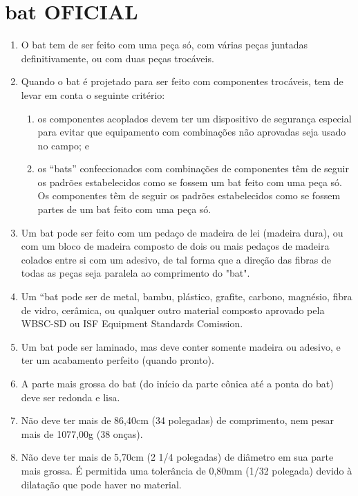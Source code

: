 \section{\gls{bat} OFICIAL }\label{sec:bat}
\begin{multicols}{2}
	\begin{enumerate}[label= \arabic*)]
		\item  O \gls{bat} tem de ser feito com uma pe\c{c}a s\'o, com v\'arias pe\c{c}as juntadas
		definitivamente, ou com duas pe\c{c}as troc\'aveis.
		\item Quando o \gls{bat} \'e projetado para ser feito com componentes troc\'aveis, tem de levar em conta o seguinte crit\'erio:
		\begin{enumerate}[label=\roman*.]
			\item os componentes acoplados devem ter um dispositivo de seguran\c{c}a especial para evitar que equipamento com combina\c{c}ões n\~ao aprovadas seja usado no campo; e
			\item os “bats” confeccionados com combina\c{c}ões de componentes t\^em de seguir os padrões estabelecidos como se fossem um \gls{bat} feito com uma pe\c{c}a s\'o. Os componentes t\^em de seguir os padrões estabelecidos como se fossem partes de um \gls{bat} feito com uma pe\c{c}a s\'o.
		\end{enumerate}
		\item  Um \gls{bat} pode ser feito com um peda\c{c}o de madeira de lei (madeira dura), ou com um bloco de madeira composto de dois ou mais peda\c{c}os de madeira colados entre si com um adesivo, de tal forma que a dire\c{c}\~ao das fibras de todas as pe\c{c}as seja paralela ao comprimento do "bat".
		\item  Um “bat pode ser de metal, bambu, pl\'astico, grafite, carbono, magn\'esio, fibra de vidro, cer\^amica, ou qualquer outro material composto aprovado pela WBSC-SD ou ISF Equipment Standards Comission.
		\item  Um \gls{bat} pode ser laminado, mas deve conter somente madeira ou adesivo, e ter um acabamento perfeito (quando pronto).
		\item  A parte mais grossa do \gls{bat} (do início da parte cônica at\'e a ponta do \gls{bat}) deve ser redonda e lisa.
		\item  N\~ao deve ter mais de 86,40cm (34 polegadas) de comprimento, nem pesar mais de 1077,00g (38 on\c{c}as).
		\item  N\~ao deve ter mais de 5,70cm (2 1/4 polegadas) de di\^ametro em sua parte mais grossa. É permitida uma toler\^ancia de 0,80mm (1/32 polegada) devido \`a dilata\c{c}\~ao que pode haver no material.

\end{enumerate}
\end{multicols}
